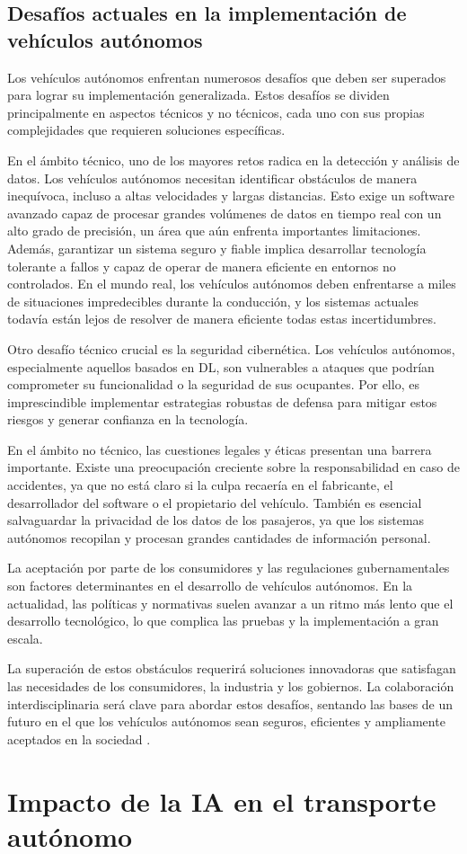 \subsection{Desafíos actuales en la implementación de vehículos autónomos}
\label{sec:desafíos}

Los vehículos autónomos enfrentan numerosos desafíos que deben ser superados para lograr su implementación generalizada. Estos desafíos se dividen principalmente en aspectos técnicos y no técnicos, cada uno con sus propias complejidades que requieren soluciones específicas.

En el ámbito técnico, uno de los mayores retos radica en la detección y análisis de datos. Los vehículos autónomos necesitan identificar obstáculos de manera inequívoca, incluso a altas velocidades y largas distancias. Esto exige un software avanzado capaz de procesar grandes volúmenes de datos en tiempo real con un alto grado de precisión, un área que aún enfrenta importantes limitaciones. Además, garantizar un sistema seguro y fiable implica desarrollar tecnología tolerante a fallos y capaz de operar de manera eficiente en entornos no controlados. En el mundo real, los vehículos autónomos deben enfrentarse a miles de situaciones impredecibles durante la conducción, y los sistemas actuales todavía están lejos de resolver de manera eficiente todas estas incertidumbres.

Otro desafío técnico crucial es la seguridad cibernética. Los vehículos autónomos, especialmente aquellos basados en \ac{DL}, son vulnerables a ataques que podrían comprometer su funcionalidad o la seguridad de sus ocupantes. Por ello, es imprescindible implementar estrategias robustas de defensa para mitigar estos riesgos y generar confianza en la tecnología.

En el ámbito no técnico, las cuestiones legales y éticas presentan una barrera importante. Existe una preocupación creciente sobre la responsabilidad en caso de accidentes, ya que no está claro si la culpa recaería en el fabricante, el desarrollador del software o el propietario del vehículo. También es esencial salvaguardar la privacidad de los datos de los pasajeros, ya que los sistemas autónomos recopilan y procesan grandes cantidades de información personal.

La aceptación por parte de los consumidores y las regulaciones gubernamentales son factores determinantes en el desarrollo de vehículos autónomos. En la actualidad, las políticas y normativas suelen avanzar a un ritmo más lento que el desarrollo tecnológico, lo que complica las pruebas y la implementación a gran escala.

La superación de estos obstáculos requerirá soluciones innovadoras que satisfagan las necesidades de los consumidores, la industria y los gobiernos. La colaboración interdisciplinaria será clave para abordar estos desafíos, sentando las bases de un futuro en el que los vehículos autónomos sean seguros, eficientes y ampliamente aceptados en la sociedad \cite{challenges-autonomous}.

\section{Impacto de la IA en el transporte autónomo}
\label{sec:ia-intro}
